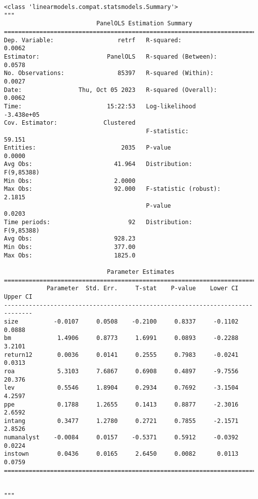 \documentclass[11pt]{article}
\makeatletter
\newcommand{\boxspacing}{\kern\kvtcb@left@rule\kern\kvtcb@boxsep}
\newcommand{\prompt}[4]{
        {\ttfamily\llap{{\color{#2}[#3]:\hspace{3pt}#4}}\vspace{-\baselineskip}}
    }
\makeatother
\begin{document}
            \begin{tcolorbox}[breakable, size=fbox, boxrule=.5pt, pad at break*=1mm, opacityfill=0]
\prompt{Out}{outcolor}{10}{\boxspacing}
\begin{Verbatim}[commandchars=\\\{\}]
<class 'linearmodels.compat.statsmodels.Summary'>
"""
                          PanelOLS Estimation Summary
================================================================================
Dep. Variable:                  retrf   R-squared:                        0.0062
Estimator:                   PanelOLS   R-squared (Between):              0.0578
No. Observations:               85397   R-squared (Within):               0.0027
Date:                Thu, Oct 05 2023   R-squared (Overall):              0.0062
Time:                        15:22:53   Log-likelihood                -3.438e+05
Cov. Estimator:             Clustered
                                        F-statistic:                      59.151
Entities:                        2035   P-value                           0.0000
Avg Obs:                       41.964   Distribution:                 F(9,85388)
Min Obs:                       2.0000
Max Obs:                       92.000   F-statistic (robust):             2.1815
                                        P-value                           0.0203
Time periods:                      92   Distribution:                 F(9,85388)
Avg Obs:                       928.23
Min Obs:                       377.00
Max Obs:                       1825.0

                             Parameter Estimates
==============================================================================
            Parameter  Std. Err.     T-stat    P-value    Lower CI    Upper CI
------------------------------------------------------------------------------
size          -0.0107     0.0508    -0.2100     0.8337     -0.1102      0.0888
bm             1.4906     0.8773     1.6991     0.0893     -0.2288      3.2101
return12       0.0036     0.0141     0.2555     0.7983     -0.0241      0.0313
roa            5.3103     7.6867     0.6908     0.4897     -9.7556      20.376
lev            0.5546     1.8904     0.2934     0.7692     -3.1504      4.2597
ppe            0.1788     1.2655     0.1413     0.8877     -2.3016      2.6592
intang         0.3477     1.2780     0.2721     0.7855     -2.1571      2.8526
numanalyst    -0.0084     0.0157    -0.5371     0.5912     -0.0392      0.0224
instown        0.0436     0.0165     2.6450     0.0082      0.0113      0.0759
==============================================================================


"""
\end{Verbatim}
\end{tcolorbox}
        
\end{document}
